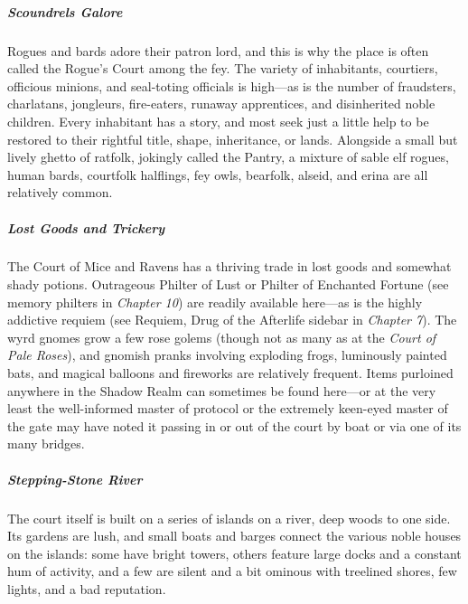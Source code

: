 \documentclass[10pt,a4paper,twoside,bg=print,twocolumn,openany,nodeprecatedcode]{dndbook}
\begin{document}
\subparagraph{Scoundrels Galore}
Rogues and bards adore their patron lord, and this is why the place is often called the Rogue's Court among the fey. The variety of inhabitants, courtiers, officious minions, and seal-toting officials is high—as is the number of fraudsters, charlatans, jongleurs, fire-eaters, runaway apprentices, and disinherited noble children. Every inhabitant has a story, and most seek just a little help to be restored to their rightful title, shape, inheritance, or lands. Alongside a small but lively ghetto of ratfolk, jokingly called the Pantry, a mixture of sable elf rogues, human bards, courtfolk halflings, fey owls, bearfolk, alseid, and erina are all relatively common.

\subparagraph{Lost Goods and Trickery}
The Court of Mice and Ravens has a thriving trade in lost goods and somewhat shady potions. Outrageous Philter of Lust or Philter of Enchanted Fortune (see memory philters in \textit{Chapter 10}) are readily available here—as is the highly addictive requiem (see Requiem, Drug of the Afterlife sidebar in \textit{Chapter 7}). The wyrd gnomes grow a few rose golems (though not as many as at the \textit{Court of Pale Roses}), and gnomish pranks involving exploding frogs, luminously painted bats, and magical balloons and fireworks are relatively frequent. Items purloined anywhere in the Shadow Realm can sometimes be found here—or at the very least the well-informed master of protocol or the extremely keen-eyed master of the gate may have noted it passing in or out of the court by boat or via one of its many bridges.

\subparagraph{Stepping-Stone River}
The court itself is built on a series of islands on a river, deep woods to one side. Its gardens are lush, and small boats and barges connect the various noble houses on the islands: some have bright towers, others feature large docks and a constant hum of activity, and a few are silent and a bit ominous with treelined shores, few lights, and a bad reputation.
\end{document}
